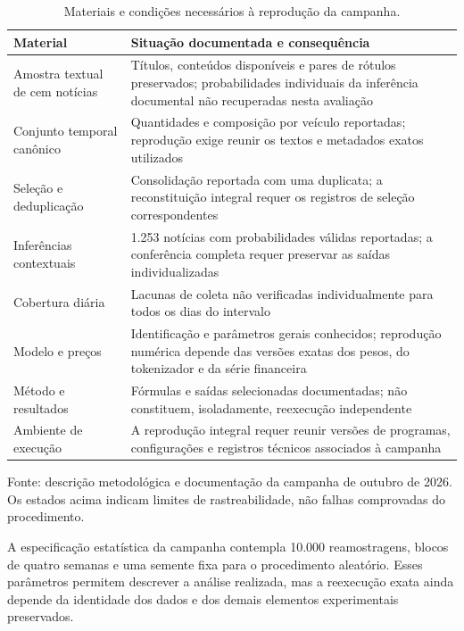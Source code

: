 \begin{table}[H]
\centering
\caption{Materiais e condições necessários à reprodução da campanha.}
\label{tab:artefatos-reproducao}
\begingroup
\renewcommand{\dissertacaotabelaparams}{%
  \setlength{\tabcolsep}{3pt}%
  \setlength{\extrarowheight}{0pt}%
  \renewcommand{\arraystretch}{1.04}%
}
\footnotesize
\begin{tabularx}{\textwidth}{@{}P{0.28\textwidth}L@{}}
\toprule
Material & Situação documentada e consequência \\
\midrule
Amostra textual de cem notícias & Títulos, conteúdos disponíveis e pares de rótulos preservados; probabilidades individuais da inferência documental não recuperadas nesta avaliação \\
Conjunto temporal canônico & Quantidades e composição por veículo reportadas; reprodução exige reunir os textos e metadados exatos utilizados \\
Seleção e deduplicação & Consolidação reportada com uma duplicata; a reconstituição integral requer os registros de seleção correspondentes \\
Inferências contextuais & 1.253 notícias com probabilidades válidas reportadas; a conferência completa requer preservar as saídas individualizadas \\
Cobertura diária & Lacunas de coleta não verificadas individualmente para todos os dias do intervalo \\
Modelo e preços & Identificação e parâmetros gerais conhecidos; reprodução numérica depende das versões exatas dos pesos, do tokenizador e da série financeira \\
Método e resultados & Fórmulas e saídas selecionadas documentadas; não constituem, isoladamente, reexecução independente \\
Ambiente de execução & A reprodução integral requer reunir versões de programas, configurações e registros técnicos associados à campanha \\
\bottomrule
\end{tabularx}
\par\smallskip
{\footnotesize Fonte: descrição metodológica e documentação da campanha de outubro de 2026. Os estados acima indicam limites de rastreabilidade, não falhas comprovadas do procedimento.}
\endgroup
\end{table}

A especificação estatística da campanha contempla 10.000 reamostragens, blocos de quatro semanas e uma semente fixa para o procedimento aleatório. Esses parâmetros permitem descrever a análise realizada, mas a reexecução exata ainda depende da identidade dos dados e dos demais elementos experimentais preservados.

